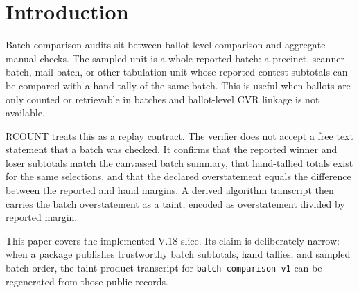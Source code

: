 \section{Introduction}

Batch-comparison audits sit between ballot-level comparison and aggregate
manual checks. The sampled unit is a whole reported batch: a precinct, scanner
batch, mail batch, or other tabulation unit whose reported contest subtotals can
be compared with a hand tally of the same batch. This is useful when ballots are
only counted or retrievable in batches and ballot-level CVR linkage is not
available.

RCOUNT treats this as a replay contract. The verifier does not accept a free
text statement that a batch was checked. It confirms that the reported winner
and loser subtotals match the canvassed batch summary, that hand-tallied totals
exist for the same selections, and that the declared overstatement equals the
difference between the reported and hand margins. A derived algorithm transcript
then carries the batch overstatement as a taint, encoded as overstatement divided
by reported margin.

This paper covers the implemented V.18 slice. Its claim is deliberately narrow:
when a package publishes trustworthy batch subtotals, hand tallies, and sampled
batch order, the taint-product transcript for \texttt{batch-comparison-v1} can
be regenerated from those public records.
